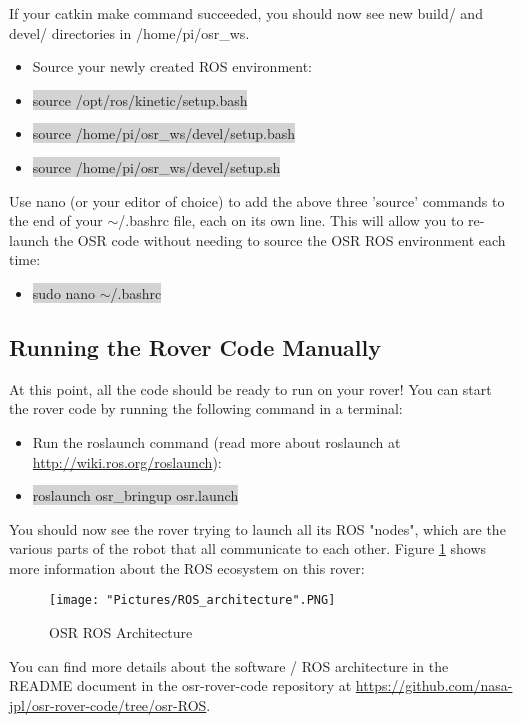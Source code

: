 \documentclass{article}
\begin{document}
\noindent If your catkin make command succeeded, you should now see new build/ and devel/ directories in /home/pi/osr\_ws.

\begin{itemize}
	\item[] Source your newly created ROS environment: 
	\item[] \colorbox{lightgray}{source /opt/ros/kinetic/setup.bash}
	\item[] \colorbox{lightgray}{source /home/pi/osr\_ws/devel/setup.bash}
	\item[] \colorbox{lightgray}{source /home/pi/osr\_ws/devel/setup.sh}
\end{itemize}

\noindent Use nano (or your editor of choice) to add the above three 'source' commands to the end of your $\sim$/.bashrc file, each on its own line.  This will allow you to re-launch the OSR code without needing to source the OSR ROS environment each time:
\begin{itemize}
	\item[] \colorbox{lightgray}{sudo nano $\sim$/.bashrc}
\end{itemize}

\subsection{Running the Rover Code Manually}
At this point, all the code should be ready to run on your rover!  You can start the rover code by running the following command in a terminal:
\begin{itemize}
	\item[] Run the roslaunch command (read more about roslaunch at \href{http://wiki.ros.org/roslaunch}{http://wiki.ros.org/roslaunch}):
	\item[] \colorbox{lightgray}{roslaunch osr\_bringup osr.launch}
\end{itemize}

\noindent You should now see the rover trying to launch all its ROS "nodes", which are the various parts of the robot that all communicate to each other.  Figure \ref{ros architecture} shows more information about the ROS ecosystem on this rover:
\begin{figure}[H]
	\centering
	\texttt{[image: "Pictures/ROS\_architecture".PNG]}
	\caption{OSR ROS Architecture}
	\label{ros architecture}
\end{figure}

You can find more details about the software / ROS architecture in the README document in the osr-rover-code repository at \href{https://github.com/nasa-jpl/osr-rover-code/tree/osr-ROS}{https://github.com/nasa-jpl/osr-rover-code/tree/osr-ROS}.
\end{document}
